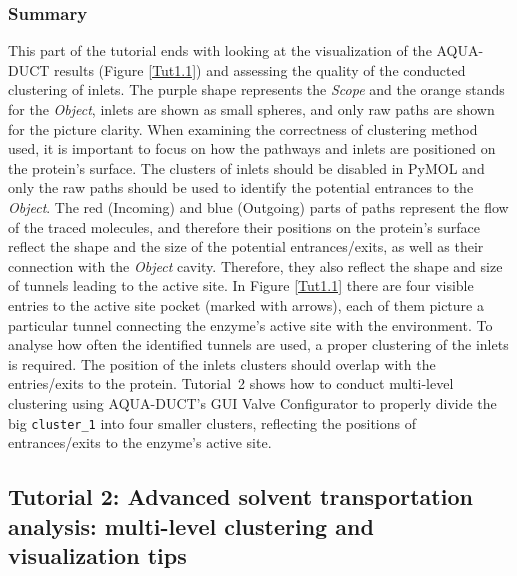 \documentclass[9pt,tutorial, pubversion]{livecoms}
\begin{document}
\subsubsection{Summary}
This part of the tutorial ends with looking at the visualization of the AQUA-DUCT results (Figure \ref{Tut1.1}) and assessing the quality of the conducted clustering of inlets. The purple shape represents the \emph{Scope} and the orange stands for the \emph{Object}, inlets are shown as small spheres, and only raw paths are shown for the picture clarity. When examining the correctness of clustering method used, it is important to focus on how the pathways and inlets are positioned on the protein's surface. The clusters of inlets should be disabled in PyMOL and only the raw paths should be used to identify the potential entrances to the \textit{Object}. The red (Incoming) and blue (Outgoing) parts of paths represent the flow of the traced molecules, and therefore their positions on the protein's surface reflect the shape and the size of the potential entrances/exits, as well as their connection with the \textit{Object} cavity. Therefore, they also reflect the shape and size of tunnels leading to the active site. In Figure \ref{Tut1.1} there are four visible entries to the active site pocket (marked with arrows), each of them picture a particular tunnel connecting the enzyme's active site with the environment. To analyse how often the identified tunnels are used, a proper clustering of the inlets is required. The position of the inlets clusters should overlap with the entries/exits to the protein. Tutorial~2 shows how to conduct multi-level clustering using AQUA-DUCT's GUI Valve Configurator to properly divide the big \texttt{cluster\_1} into four smaller clusters, reflecting the positions of entrances/exits to the enzyme's active site.

\subsection{Tutorial 2: Advanced solvent transportation analysis: multi-level clustering and visualization tips}
\end{document}
